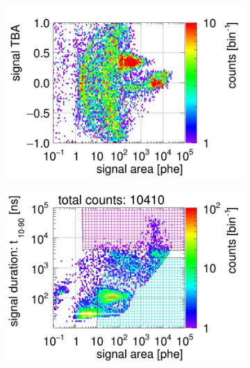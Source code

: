 \begin{landscape}
\begin{figure}[!p]
\begin{subfigure}[t]{0.33\textwidth}
			\includegraphics[width=\figurewidth,clip,trim={0 0 0 40}]{Figures/GasTest/CutsValid/res64765/tbapaX23Vecfig64765.jpg}
			\caption{}
			\label{fig:signal selection dv 08 02}
		\end{subfigure}
		\begin{subfigure}[t]{0.33\textwidth}
			\centering
			\includegraphics[width=\figurewidth,clip,trim={0 98 0 0}]{Figures/GasTest/CutsValid/res64765/pdpa26Vecfig64765.jpg}

\end{subfigure}
\end{figure}
\end{landscape}
